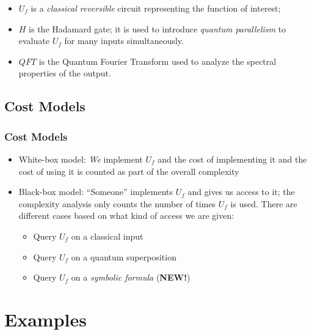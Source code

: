\documentclass{beamer}
\begin{document}
\begin{frame}
\begin{overprint}
\end{overprint}
\begin{itemize}
\item $U_f$ is a \emph{classical reversible} circuit representing the
  function of interest; 
\item $H$ is the Hadamard gate; it is used to introduce \emph{quantum
    parallelism} to evaluate $U_f$ for many inputs simultaneously.
\item $\mathit{QFT}$ is the Quantum Fourier Transform used to analyze
  the spectral properties of the output.  
\end{itemize}
\end{frame}

\subsection[Cost Models]{Cost Models}

\begin{frame}
  \frametitle{Cost Models}
  \begin{itemize}
\item White-box model: \emph{We} implement $U_f$ and the cost of
  implementing it and the cost of using it is counted as part of the
  overall complexity
\item Black-box model: ``Someone'' implements $U_f$ and gives us
  access to it; the complexity analysis only counts the number of
  times $U_f$ is used. There are different cases based on what kind of
  access we are given:
  \begin{itemize}
    \item Query $U_f$ on a classical input 
    \item Query $U_f$ on a quantum superposition
    \item Query $U_f$ on a \emph{symbolic formula} (\textbf{NEW!})
  \end{itemize}
    \end{itemize}
  
\end{frame}


\section[Examples]{Examples}

\end{document}
